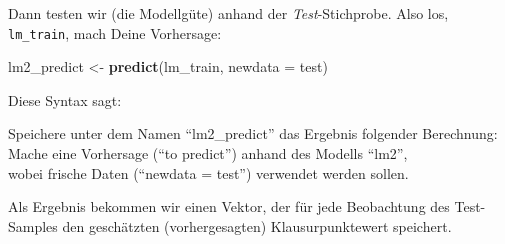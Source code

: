 \documentclass[12pt,ngerman,]{book}
\makeatletter
\newenvironment{Shaded}{\begin{snugshade}}{\end{snugshade}}
\newcommand{\KeywordTok}[1]{\textcolor[rgb]{0.13,0.29,0.53}{\textbf{#1}}}
\newcommand{\DataTypeTok}[1]{\textcolor[rgb]{0.13,0.29,0.53}{#1}}
\newcommand{\DecValTok}[1]{\textcolor[rgb]{0.00,0.00,0.81}{#1}}
\newcommand{\StringTok}[1]{\textcolor[rgb]{0.31,0.60,0.02}{#1}}
\newcommand{\CommentTok}[1]{\textcolor[rgb]{0.56,0.35,0.01}{\textit{#1}}}
\newcommand{\OtherTok}[1]{\textcolor[rgb]{0.56,0.35,0.01}{#1}}
\newcommand{\OperatorTok}[1]{\textcolor[rgb]{0.81,0.36,0.00}{\textbf{#1}}}
\newcommand{\NormalTok}[1]{#1}
\newenvironment{kframe}{%
\medskip{}
\setlength{\fboxsep}{.8em}
 \def\at@end@of@kframe{}%
 \ifinner\ifhmode%
  \def\at@end@of@kframe{\end{minipage}}%
  \begin{minipage}{\columnwidth}%
 \fi\fi%
 \def\FrameCommand##1{\hskip\@totalleftmargin \hskip-\fboxsep
 \colorbox{shadecolor}{##1}\hskip-\fboxsep
     \hskip-\linewidth \hskip-\@totalleftmargin \hskip\columnwidth}%
 \MakeFramed {\advance\hsize-\width
   \@totalleftmargin\z@ \linewidth\hsize
   \@setminipage}}%
 {\par\unskip\endMakeFramed%
 \at@end@of@kframe}
\renewenvironment{Shaded}{\begin{kframe}}{\end{kframe}}
\theoremstyle{definition}
\theoremstyle{definition}
\theoremstyle{remark}
\let\BeginKnitrBlock\begin \let\EndKnitrBlock\end
\makeatother
\begin{document}
\begin{Shaded}
\end{Shaded}

Dann testen wir (die Modellgüte) anhand der \emph{Test}-Stichprobe. Also
los, \texttt{lm\_train}, mach Deine Vorhersage:

\begin{Shaded}
\begin{Highlighting}[]
\NormalTok{lm2_predict <-}\StringTok{ }\KeywordTok{predict}\NormalTok{(lm_train, }\DataTypeTok{newdata =}\NormalTok{ test)}
\end{Highlighting}
\end{Shaded}

Diese Syntax sagt:

\BeginKnitrBlock{rmdpseudocode}
Speichere unter dem Namen ``lm2\_predict'' das Ergebnis folgender
Berechnung:\\
Mache eine Vorhersage (``to predict'') anhand des Modells ``lm2'',\\
wobei frische Daten (``newdata = test'') verwendet werden sollen.
\EndKnitrBlock{rmdpseudocode}

Als Ergebnis bekommen wir einen Vektor, der für jede Beobachtung des
Test-Samples den geschätzten (vorhergesagten) Klausurpunktewert
speichert.

\begin{Shaded}
\end{Shaded}
\end{document}

